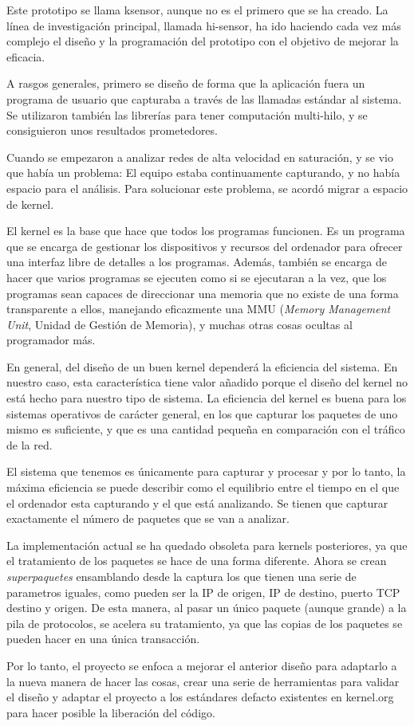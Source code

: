 Este prototipo se llama ksensor, aunque no es el primero que se ha creado. La línea de investigación principal, llamada hi-sensor, ha ido haciendo cada vez más complejo el diseño y la programación del prototipo con el objetivo de mejorar la eficacia.

A rasgos generales, primero se diseño de forma que la aplicación fuera un programa de usuario que capturaba a través de las llamadas estándar al sistema. Se utilizaron también las librerías para tener computación multi-hilo, y se consiguieron unos resultados prometedores.

Cuando se empezaron a analizar redes de alta velocidad en saturación, y se vio que había un problema: El equipo estaba continuamente capturando, y no había espacio para el análisis. Para solucionar este problema, se acordó migrar a espacio de kernel.

El kernel es la base que hace que todos los programas funcionen. Es un programa que se encarga de gestionar los dispositivos y recursos del ordenador para ofrecer una interfaz libre de detalles a los programas. Además, también se encarga de hacer que varios programas se ejecuten como si se ejecutaran a la vez, que los programas sean capaces de direccionar una memoria que no existe de una forma transparente a ellos, manejando eficazmente una MMU (\textit{Memory Management Unit}, Unidad de Gestión de Memoria), y muchas otras cosas ocultas al programador más.

En general, del diseño de un buen kernel dependerá la eficiencia del sistema. En nuestro caso, esta característica tiene valor añadido porque el diseño del kernel no está hecho para nuestro tipo de sistema. La eficiencia del kernel es buena para los sistemas operativos de carácter general, en los que capturar los paquetes de uno mismo es suficiente, y que es una cantidad pequeña en comparación con el tráfico de la red.

El sistema que tenemos es únicamente para capturar y procesar y por lo tanto, la máxima eficiencia se puede describir como el equilibrio entre el tiempo en el que el ordenador esta capturando y el que está analizando. Se tienen que capturar exactamente el número de paquetes que se van a analizar.

La implementación actual se ha quedado obsoleta para kernels posteriores, ya que el tratamiento de los paquetes se hace de una forma diferente. Ahora se crean \textit{superpaquetes} ensamblando desde la captura los que tienen una serie de parametros iguales, como pueden ser la IP de origen, IP de destino, puerto TCP destino y origen. De esta manera, al pasar un único paquete (aunque grande) a la pila de protocolos, se acelera su tratamiento, ya que las copias de los paquetes se pueden hacer en una única transacción.

Por lo tanto, el proyecto se enfoca a mejorar el anterior diseño para adaptarlo a la nueva manera de hacer las cosas, crear una serie de herramientas para validar el diseño y adaptar el proyecto a los estándares defacto existentes en kernel.org para hacer posible la liberación del código.